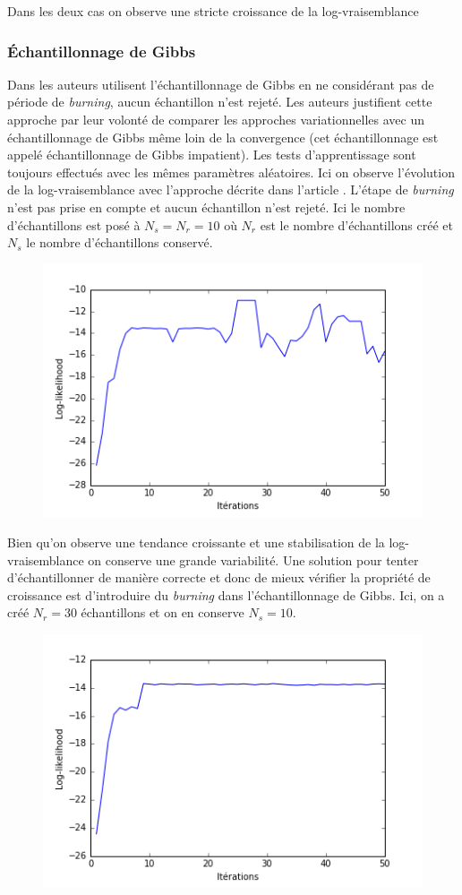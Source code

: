 \documentclass[10pt,a4paper]{article}
\begin{document}
Dans les deux cas on observe une stricte croissance de la log-vraisemblance
\subsubsection{Échantillonnage de Gibbs}
Dans \cite{ghahramani1997factorial} les auteurs utilisent l'échantillonnage de Gibbs en ne considérant pas de période de \textit{burning}, aucun échantillon n'est rejeté. Les auteurs justifient cette approche par leur volonté de comparer les approches variationnelles avec un échantillonnage de Gibbs même loin de la convergence (cet échantillonnage est appelé échantillonnage de Gibbs impatient). Les tests d'apprentissage sont toujours effectués avec les mêmes paramètres aléatoires. Ici on observe l'évolution de la log-vraisemblance avec l'approche décrite dans l'article \cite{ghahramani1997factorial}. L'étape de \textit{burning} n'est pas prise en compte et aucun échantillon n'est rejeté. Ici le nombre d'échantillons est posé à $N_s=N_r=10$ où $N_r$ est le nombre d'échantillons créé et $N_s$ le nombre d'échantillons conservé.
\begin{figure}[H]
\centering
\includegraphics[scale=0.5]{M3_K2_gibbsnoburning.png}
\end{figure}
Bien qu'on observe une tendance croissante et une stabilisation de la log-vraisemblance on conserve une grande variabilité. Une solution pour tenter d'échantillonner de manière correcte et donc de mieux vérifier la propriété de croissance est d'introduire du \textit{burning} dans l'échantillonnage de Gibbs. Ici, on a créé $N_r = 30$ échantillons et on en conserve $N_s = 10$.
\begin{figure}[H]
\centering
\includegraphics[scale=0.5]{M3_K2_gibbs.png}
\end{figure}
\end{document}
